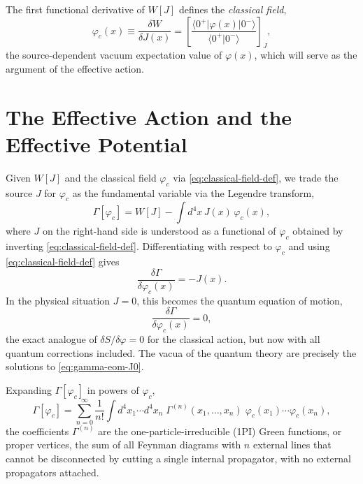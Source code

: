 The first functional derivative of $W[J]$ defines the \emph{classical field},
\begin{equation}
    \varphi_c(x) \equiv \frac{\delta W}{\delta J(x)}
    = \left[\frac{\langle 0^+|\varphi(x)|0^-\rangle}
                 {\langle 0^+|0^-\rangle}\right]_J,
    \label{eq:classical-field-def}
\end{equation}
the source-dependent vacuum expectation value of $\varphi(x)$, which will
serve as the argument of the effective action.


\section{The Effective Action and the Effective Potential}
\label{sec:effective-action}

Given $W[J]$ and the classical field $\varphi_c$ via \eqref{eq:classical-field-def},
we trade the source $J$ for $\varphi_c$ as the fundamental variable via the
Legendre transform,
\begin{equation}
    \Gamma[\varphi_c] = W[J] - \int d^4x\, J(x)\,\varphi_c(x),
    \label{eq:effective-action-def}
\end{equation}
where $J$ on the right-hand side is understood as a functional of $\varphi_c$
obtained by inverting \eqref{eq:classical-field-def}. Differentiating with
respect to $\varphi_c$ and using \eqref{eq:classical-field-def} gives
\begin{equation}
    \frac{\delta\Gamma}{\delta\varphi_c(x)} = -J(x).
    \label{eq:gamma-eom}
\end{equation}
In the physical situation $J=0$, this becomes the quantum equation of motion,
\begin{equation}
    \frac{\delta\Gamma}{\delta\varphi_c(x)} = 0,
    \label{eq:gamma-eom-J0}
\end{equation}
the exact analogue of $\delta S/\delta\varphi = 0$ for the classical action,
but now with all quantum corrections included. The vacua of the quantum theory
are precisely the solutions to \eqref{eq:gamma-eom-J0}.

Expanding $\Gamma[\varphi_c]$ in powers of $\varphi_c$,
\begin{equation}
    \Gamma[\varphi_c] = \sum_{n=0}^{\infty} \frac{1}{n!}
    \int d^4x_1\cdots d^4x_n\;
    \Gamma^{(n)}(x_1,\ldots,x_n)\;
    \varphi_c(x_1)\cdots\varphi_c(x_n),
    \label{eq:gamma-1PI-expansion}
\end{equation}
the coefficients $\Gamma^{(n)}$ are the one-particle-irreducible (1PI) Green
functions, or proper vertices, the sum of all Feynman diagrams with $n$ external
lines that cannot be disconnected by cutting a single internal propagator, with
no external propagators attached.

